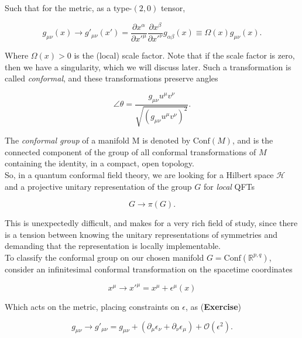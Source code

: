 \documentclass[10pt]{article}
\begin{document}
\noindent Such that for the metric, as a type-$(2,0)$ tensor,

\begin{equation}
g_{\mu\nu} (x) \rightarrow g'_{\mu\nu} (x') = \frac{\partial x^\alpha}{\partial x'^\mu} \frac{\partial x^\beta}{\partial x'^\nu} g_{\alpha \beta} (x) \equiv \Omega (x) g_{\mu\nu} (x).
\end{equation}

\noindent Where $\Omega(x) > 0$ is the (local) scale factor. Note that if the scale factor is zero, then we have a singularity, which we will discuss later. Such a transformation is called \textit{conformal}, and these transformations preserve angles

\begin{equation}
\angle \theta = \frac{g_{\mu\nu} u^\mu v^\nu}{\sqrt{(g_{\mu\nu} u^\mu v^\nu)^2}}.
\end{equation}

\noindent The \textit{conformal group} of a manifold M is denoted by $\text{Conf}(M)$, and is the connected component of the group of all conformal transformations of $M$ containing the identity, in a compact, open topology. \\

\noindent So, in a quantum conformal field theory, we are looking for a Hilbert space $\mathcal{H}$ and a projective unitary representation of the group $G$ for \textit{local} QFTs

\begin{equation}
G \rightarrow \pi (G).
\end{equation}

\noindent This is unexpectedly difficult, and makes for a very rich field of study, since there is a tension between knowing the unitary representations of symmetries and demanding that the representation is locally implementable. \\

\noindent To classify the conformal group on our chosen manifold $G = \text{Conf} (\mathbb{R}^{p,q})$, consider an infinitesimal conformal transformation on the spacetime coordinates

\begin{equation}
x^\mu \rightarrow x'^\mu = x^\mu +  \epsilon^\mu (x)
\end{equation}

\noindent Which acts on the metric, placing constraints on $\epsilon$, as (\textbf{Exercise})

\begin{equation}
g_{\mu\nu} \rightarrow g'_{\mu\nu} = g_{\mu\nu} + (\partial_\mu \epsilon_\nu + \partial_\nu \epsilon_\mu) + \mathcal{O} (\epsilon^2).
\end{equation}
\end{document}
